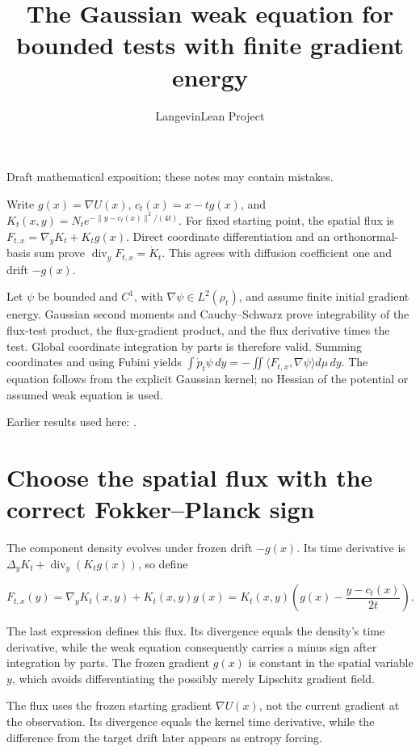 \documentclass[11pt,a4paper]{article}
\title{\texorpdfstring{The Gaussian weak equation for bounded tests with finite gradient energy}{The Gaussian weak equation for bounded tests with finite gradient energy}}
\author{LangevinLean Project}
\date{}
\begin{document}
\maketitle
Draft mathematical exposition; these notes may contain mistakes.


Write \(g(x)=\nabla U(x)\), \(c_t(x)=x-tg(x)\), and \(K_t(x,y)=N_t e^{-\|y-c_t(x)\|^2/(4t)}\). For fixed starting point, the spatial flux is \(F_{t,x}=\nabla_yK_t+K_tg(x)\). Direct coordinate differentiation and an orthonormal-basis sum prove \(\operatorname{div}_yF_{t,x}=\dot K_t\). This agrees with diffusion coefficient one and drift \(-g(x)\).



Let \(\psi\) be bounded and \(C^1\), with \(\nabla\psi\in L^2(\rho_t)\), and assume finite initial gradient energy. Gaussian second moments and Cauchy–Schwarz prove integrability of the flux-test product, the flux-gradient product, and the flux derivative times the test. Global coordinate integration by parts is therefore valid. Summing coordinates and using Fubini yields \(\int\dot p_t\psi\,dy=-\iint\langle F_{t,x},\nabla\psi\rangle d\mu\,dy\). The equation follows from the explicit Gaussian kernel; no Hessian of the potential or assumed weak equation is used.



Earlier results used here: \cite[Section~3.38]{LangevinLean2026ULASC}.

\section{\texorpdfstring{Choose the spatial flux with the correct Fokker–Planck sign}{Choose the spatial flux with the correct Fokker–Planck sign}}


The component density evolves under frozen drift \(-g(x)\). Its time derivative is \(\Delta_yK_t+\operatorname{div}_y(K_tg(x))\), so define

\[F_{t,x}(y)=\nabla_yK_t(x,y)+K_t(x,y)g(x)=K_t(x,y)\left(g(x)-\frac{y-c_t(x)}{2t}\right).\]

The last expression defines this flux. Its divergence equals the density's time derivative, while the weak equation consequently carries a minus sign after integration by parts. The frozen gradient \(g(x)\) is constant in the spatial variable \(y\), which avoids differentiating the possibly merely Lipschitz gradient field.



The flux uses the frozen starting gradient \(\nabla U(x)\), not the current gradient at the observation. Its divergence equals the kernel time derivative, while the difference from the target drift later appears as entropy forcing.
\end{document}
